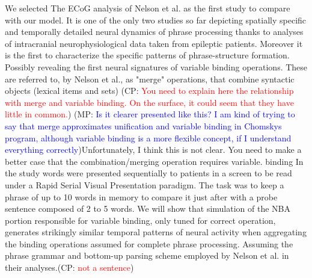 \documentclass[10pt]{article}
\newcommand{\noteCP}[1]{(CP: \textcolor{red}{#1})}
\newcommand{\noteMP}[3]{(MP: \textcolor{blue}{#1})}
\begin{document}
We selected The ECoG analysis of Nelson et al.\cite{Nelson_2017} as the first study to compare with our model.
It is one of the only two studies so far depicting spatially specific and temporally detailed neural dynamics of phrase processing thanks to analyses of intracranial neurophysiological data taken from epileptic patients.
Moreover it is the first to characterize the specific patterns of phrase-structure formation. Possibly revealing the first neural signatures of variable binding operations. These are referred to, by Nelson et al., as "merge" operations, that combine syntactic objects (lexical items and sets) \noteCP{You need to explain here the relationship with merge and variable binding. On the surface, it could seem that they have little in common.}
\noteMP{Is it clearer presented like this? I am kind of trying to say that merge approximates unification and variable binding in Chomskys program, although variable binding is a more flexible concept, if I understand everything correctly}.\noteCP{Unfortunately, I think this is not clear. You need to make a better case that the combination/merging operation requires variable. binding}
In the study words were presented sequentially to patients in a screen to be read under a Rapid Serial Visual Presentation paradigm.
The task was to keep a phrase of up to 10 words in memory to compare it just after with a probe sentence composed of 2 to 5 words.
We will show that simulation of the NBA portion responsible for variable binding, only tuned for correct operation, generates strikingly similar temporal patterns of neural activity when aggregating the binding operations assumed for complete phrase processing.
Assuming the phrase grammar and bottom-up parsing scheme employed by Nelson et al. in their analyses.\noteCP{not a sentence}
\end{document}
